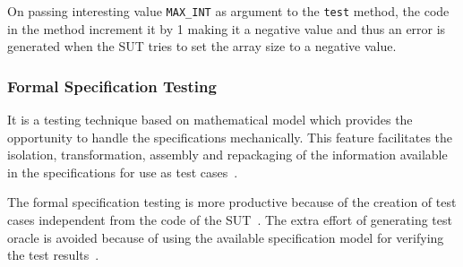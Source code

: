 On passing interesting value \verb+MAX_INT+ as argument to the \verb+test+ method, the code in the method increment it by 1 making it a negative value and thus an error is generated when the SUT tries to set the array size to a negative value.

\subsubsection{Formal Specification Testing}
It is a testing technique based on mathematical model which provides the opportunity to handle the specifications mechanically. This feature facilitates the isolation, transformation, assembly and repackaging of the information available in the specifications for use as test cases~\cite{donat1997automating}.

The formal specification testing is more productive because of the creation of test cases independent from the code of the SUT~\cite{gaudel2010software}. The extra effort of generating test oracle is avoided because of using the available specification model for verifying the test results~\cite{bertolino2007software}.
  








